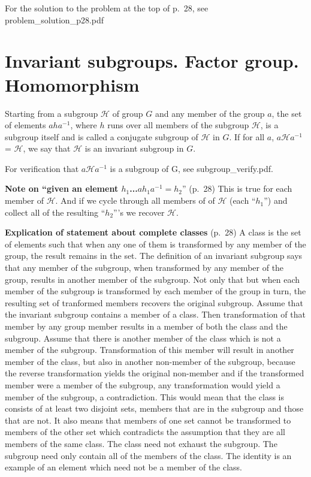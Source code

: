 For the solution to the problem at the top of p.\ 28, see
problem\_solution\_p28.pdf

\section{Invariant subgroups. Factor group. Homomorphism}

Starting from a subgroup $\mathcal H$ of group $G$ and any member of
the group $a$, the set of elements $aha^{-1}$, where $h$ runs over all
members of the subgroup $\mathcal H$, is a subgroup itself and is
called a conjugate subgroup of $\mathcal H$ in $G$. If for all $a$,
$a{\mathcal H} a^{-1}$ = $\mathcal H$, we say that $\mathcal H$ is an
invariant subgroup in $G$.

For verification that $a\mathcal Ha^{-1}$ is a subgroup of G, see
subgroup\_verify.pdf.

{\bf Note on ``given an element $h_1$...$ah_1a^{-1} = h_2$}'' (p.\ 28) This is true for each member of $\mathcal H$. And if we cycle
through all members of of $\mathcal H$ (each ``$h_1$'') and collect
all of the resulting ``$h_2$'''s we recover $\mathcal H$.

{\bf Explication of statement about complete classes} (p.\ 28) A class
is the set of elements such that when any one of them is transformed
by any member of the group, the result remains in the set. The
definition of an invariant subgroup says that any member of the
subgroup, when transformed by any member of the group, results in
another member of the subgroup.  Not only that but when each member of
the subgroup is transformed by each member of the group in turn, the
resulting set of tranformed members recovers the original
subgroup. Assume that the invariant subgroup contains a member of a
class. Then transformation of that member by any group member results
in a member of both the class and the subgroup. Assume that there is
another member of the class which is not a member of the
subgroup. Transformation of this member will result in another member
of the class, but also in another non-member of the subgroup, because
the reverse transformation yields the original non-member and if the
transformed member were a member of the subgroup, any transformation
would yield a member of the subgroup, a contradiction. This would mean
that the class is consists of at least two disjoint sets, members that
are in the subgroup and those that are not. It also means that members
of one set cannot be transformed to members of the other set which
contradicts the assumption that they are all members of the same
class. The class need not exhaust the subgroup. The subgroup need only
contain all of the members of the class. The identity is an example of
an element which need not be a member of the class.

